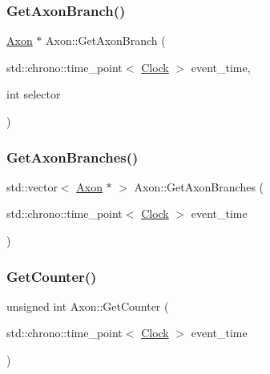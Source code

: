 \mbox{\label{classAxon_a723b00504169712e47f7437111ad4ae3}} 
\subsubsection{\texorpdfstring{Get\+Axon\+Branch()}{GetAxonBranch()}}
{\footnotesize\ttfamily \mbox{\hyperlink{classAxon}{Axon}} $\ast$ Axon\+::\+Get\+Axon\+Branch (\begin{DoxyParamCaption}\item[{std\+::chrono\+::time\+\_\+point$<$ \mbox{\hyperlink{universe_8h_a0ef8d951d1ca5ab3cfaf7ab4c7a6fd80}{Clock}} $>$}]{event\+\_\+time,  }\item[{int}]{selector }\end{DoxyParamCaption})}

\mbox{\label{classAxon_adf5796ef2f72ce56516b37e7e09e9d6c}} 
\subsubsection{\texorpdfstring{Get\+Axon\+Branches()}{GetAxonBranches()}}
{\footnotesize\ttfamily std\+::vector$<$ \mbox{\hyperlink{classAxon}{Axon}} $\ast$ $>$ Axon\+::\+Get\+Axon\+Branches (\begin{DoxyParamCaption}\item[{std\+::chrono\+::time\+\_\+point$<$ \mbox{\hyperlink{universe_8h_a0ef8d951d1ca5ab3cfaf7ab4c7a6fd80}{Clock}} $>$}]{event\+\_\+time }\end{DoxyParamCaption})}

\mbox{\label{classAxon_a390ff1f3d85034fc85bcafc7374da9c7}} 
\subsubsection{\texorpdfstring{Get\+Counter()}{GetCounter()}}
{\footnotesize\ttfamily unsigned int Axon\+::\+Get\+Counter (\begin{DoxyParamCaption}\item[{std\+::chrono\+::time\+\_\+point$<$ \mbox{\hyperlink{universe_8h_a0ef8d951d1ca5ab3cfaf7ab4c7a6fd80}{Clock}} $>$}]{event\+\_\+time }\end{DoxyParamCaption})\hspace{0.3cm}{\ttfamily [inline]}}

